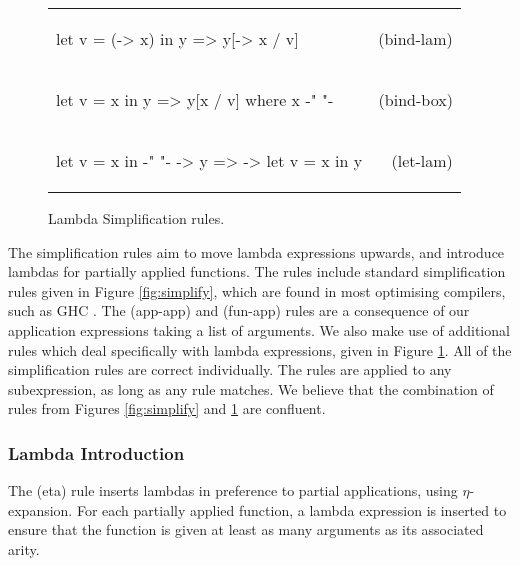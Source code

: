 \documentclass{sigplanconf}
\newcommand{\simp}[2]{\begin{minipage}{6.4cm}#2\end{minipage} & (#1) \\}
\newenvironment{simplify}
    {\noindent
     \begin{flushright}
     \begin{tabular}{p{6.5cm}r}
    }
    {\end{tabular}
     \end{flushright}
    }
\begin{document}
\begin{figure}
\begin{simplify}

\simp{bind-lam}{
\ignore\begin{code}
let v = (\w -> x) in y
    => y[\w -> x / v]
\end{code}}

\simp{bind-box}{
\ignore\begin{code}
let v = x in y
    => y[x / v]
    where x {-" \text{ is a boxed lambda (see \S\ref{sec:inlining})} "-}
\end{code}}

\simp{let-lam}{
\ignore\begin{code}
let v = x in {-" "-} \w -> y
    => \w -> let v = x in y
\end{code}}

\end{simplify}
\caption{Lambda Simplification rules.}
\label{fig:lambda_simplify}
\end{figure}

The simplification rules aim to move lambda expressions upwards, and introduce lambdas for partially applied functions. The rules include standard simplification rules given in Figure \ref{fig:simplify}, which are found in most optimising compilers, such as GHC \cite{spj:transformation}. The (app-app) and (fun-app) rules are a consequence of our application expressions taking a list of arguments. We also make use of additional rules which deal specifically with lambda expressions, given in Figure \ref{fig:lambda_simplify}. All of the simplification rules are correct individually. The rules are applied to any subexpression, as long as any rule matches. We believe that the combination of rules from Figures \ref{fig:simplify} and \ref{fig:lambda_simplify} are confluent.

\subsubsection{Lambda Introduction}

The (eta) rule inserts lambdas in preference to partial applications, using $\eta$-expansion. For each partially applied function, a lambda expression is inserted to ensure that the function is given at least as many arguments as its associated arity.
\end{document}
